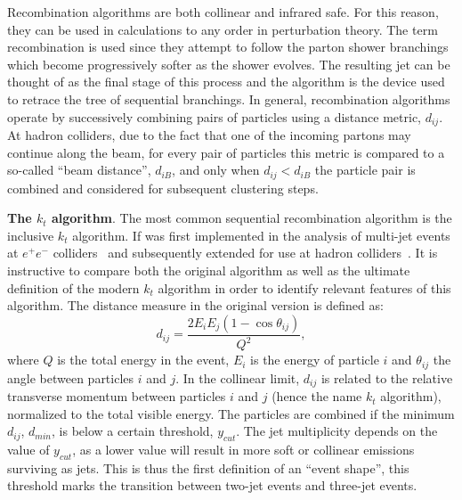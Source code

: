 Recombination algorithms are both collinear and infrared safe. For this reason, they can be used in calculations to any order in perturbation theory. %
The term recombination is used since they attempt to follow the parton shower branchings which become progressively softer as the shower evolves. The resulting jet can be thought of as the final stage of this process and the algorithm is the device used to retrace the tree of sequential branchings.
In general, recombination algorithms operate by successively combining pairs of particles using a distance metric, $d_{ij}$.  At hadron colliders, due to the fact that one of the incoming partons may continue along the beam, for every pair of particles this metric is compared to a so-called ``beam distance'', $d_{iB}$, and only when  $d_{ij}<d_{iB}$ the particle pair is combined and considered for subsequent clustering steps. 


\vspace{0.5cm}
\textbf{The $k_t$ algorithm}. The most common sequential recombination algorithm is the inclusive $k_t$ algorithm.  If was first implemented in the analysis of multi-jet events at $e^+ e^-$ colliders~\cite{JADE} and subsequently extended for use at hadron colliders~\cite{kt2,kt1}. 
It is instructive to compare both the original algorithm as well as the ultimate definition of the modern $k_t$ algorithm in order to identify relevant features of this algorithm.
The distance measure in the original  version is defined as: %
\begin{equation} 
d_{ij} = \frac{2E_i E_j (1- \cos \theta_{ij}) }{Q^2},
\label{eqn:origkt}
\end{equation}
where $Q$ is the total energy in the event, $E_i$ is the energy of particle $i$ and $\theta_{ij}$ the angle between particles $i$ and $j$. In the collinear limit, $d_{ij}$ is related to the relative transverse momentum between particles $i$ and $j$ (hence the name $k_t$ algorithm), normalized to the total visible energy.
The particles are combined if the minimum $d_{ij}$, $d_{min}$, is below a certain threshold, $y_{cut}$.  The jet multiplicity depends on the value of $y_{cut}$, as a lower value will result in more soft or collinear emissions surviving as jets. This is thus the first definition of an ``event shape'', this threshold marks the transition between two-jet events and three-jet events.

